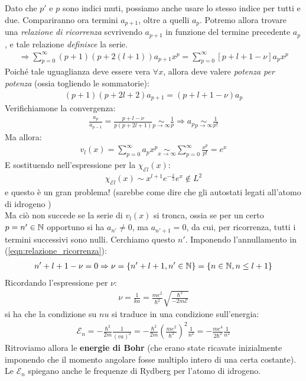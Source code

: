 \documentclass[../../FisicaTeorica.tex]{subfiles}
\begin{document}
Dato che $p'$ e $p$ sono indici muti, possiamo anche usare lo stesso indice per tutti e due. Compariranno ora termini $a_{p+1}$, oltre a quelli $a_p$. Potremo allora trovare una \textit{relazione di ricorrenza} scvrivendo $a_{p+1}$ in funzione del termine precedente $a_p$, e tale relazione \textit{definisce} la serie.
\begin{align*}
\Rightarrow  \sum_{p=0}^\infty  (p+1)(p + 2(l+1)) a_{p+1}   x^p = \sum_{p=0}^\infty [p+ l+1-\nu]a_p x^p
\end{align*}
Poiché tale uguaglianza deve essere vera $\forall x$, allora deve valere \textit{potenza per potenza} (ossia togliendo le sommatorie):
\begin{align}
(p+1)(p+2l+2)a_{p+1} = (p+l+1-\nu)a_p
\label{eqn:relazione_ricorrenza}
\end{align}
Verifichiamone la convergenza:
\begin{align*}
\frac{a_p}{a_{p-1}} = \frac{p+l-\nu}{p(p+2l+1)} \underset{p\to \infty}{\sim} \frac{1}{p} \Rightarrow a_p \underset{p \to \infty}{\sim}\frac{1}{p!}
\end{align*}
Ma allora:
\begin{align*}
v_l(x) = \sum_{p=0}^\infty a_p x^p \underset{x\to\infty}{\sim} \sum_{p=0}^\infty \frac{x^p}{p!} = e^x
\end{align*}
E sostituendo nell'espressione per la $\chi_{\mathcal{E}l}(x)$:
\begin{align*}
\chi_{\mathcal{E}l}(x) \sim x^{l+1} e^{-\frac{x}{2}} e^x \notin L^2
\end{align*}
e questo è un gran problema! (sarebbe come dire che gli autostati legati all'atomo di idrogeno )\\

Ma ciò non succede se la serie di $v_l(x)$ si tronca, ossia se per un certo $p = n' \in \mathbb{N}$ opportuno si ha $a_{n'}\neq 0$, ma $a_{n' +1}=0$, da cui, per ricorrenza, tutti i termini successivi sono nulli. Cerchiamo questo $n'$. Imponendo l'annullamento in (\ref{eqn:relazione_ricorrenza}):
\begin{align*}
n' + l +1 -\nu=0 \Rightarrow \nu = \{n' + l +1, n' \in \mathbb{N}\} = \{n\in \mathbb{N}, n\leq l+1\}
\end{align*}
Ricordando l'espressione per $\nu$:
\begin{align*}
\nu = \frac{1}{ka}=\frac{me^2}{\hbar^2} \sqrt{\frac{\hbar^2}{-2m\mathcal{E}}}
\end{align*}
si ha che la condizione su $nu$ si traduce in una condizione sull'energia:
\begin{align*}
\mathcal{E}_n = -\frac{\hbar^2}{2m}\frac{1}{(va)^2} = -\frac{\hbar^2}{2m}\left(\frac{me^2}{\hbar^2}\right)^2 \frac{1}{n^2} = -\frac{me^4}{2\hbar^2}\frac{1}{n^2}
\end{align*}
Ritroviamo allora le \textbf{energie di Bohr} (che erano state ricavate inizialmente imponendo che il momento angolare fosse multiplo intero di una certa costante). Le $\mathcal{E}_n$ spiegano anche le frequenze di Rydberg per l'atomo di idrogeno.\\
\end{document}
